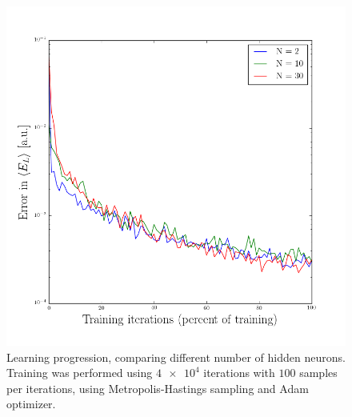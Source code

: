\documentclass[a4paper, 11pt]{article}
\begin{document}
\begin{figure}[ht]
    \centering
    \includegraphics[width=0.8\linewidth]{../results/learning-N-variants.png}
    \caption{Learning progression, comparing different number of hidden neurons.
    Training was performed using $\num{4e4}$ iterations with $100$
    samples per iterations, using Metropolis-Hastings sampling and Adam
    optimizer.}
    \label{fig:rbm-training-N}
\end{figure}
\end{document}
